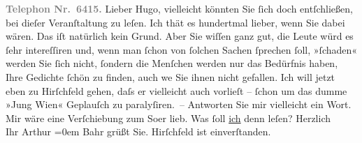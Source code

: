 \begin{ledgroupsized}[t]{13cm}
           \pstart
           \textcolor{gray}{\textbf{Telephon Nr. 6415.}}\pend
           \pstart
           Lieber Hugo, vielleicht könnten Sie ſich doch entſchließen, bei
               dieſer Veranſtaltung zu leſen. Ich thät es hundertmal lieber, wenn Sie dabei wären.
               Das iſt natürlich kein Grund. Aber Sie wiſſen ganz gut, die Leute würd es ſehr
               intereſſiren {\pb}und, wenn man ſchon von ſolchen Sachen
               ſprechen ſoll, »ſchaden« werden Sie ſich nicht, ſondern die Menſchen werden nur das
               Bedürfnis haben, Ihre Gedichte ſchön zu finden, auch we{\geminationn}
               Sie ihnen nicht gefallen. Ich will jetzt eben zu Hirſchfeld gehen, daſs {\pb}er vielleicht auch
               vorlieſt – ſchon um das dumme »Jung Wien«
               Geplauſch zu paralyſiren. –\pend
           \pstart
           Antworten Sie mir vielleicht ein Wort.\pend
           \pstart
           Mir wäre eine Verſchiebung zum So{\geminationm}er lieb. Was ſoll \uline{ich} denn leſen?\pend
           \pstart
           {\pb}Herzlich{\\[\baselineskip]}Ihr \spacefill\mbox{Arthur}\pend
           \leftskip=0em{}\pstart
           \noindent{}Bahr grüßt Sie.\pend
           \pstart
           \noindent{}Hirſchfeld ist einverſtanden.\pend
           \pstart
           \textcolor{gray}{\textbf{\label{T_L00649_1v}\label{T_L00649_1h}}}\pend
           
         
         \endnumbering{}\end{ledgroupsized}  \newcommand{\dateiname}{L00649}\newcommand{\titel}{Arthur Schnitzler an Hugo von Hofmannsthal, 12. 3. 1897}\newcommand{\editorInnen}{ Martin Anton Müller und Gerd-Hermann Susen}
      